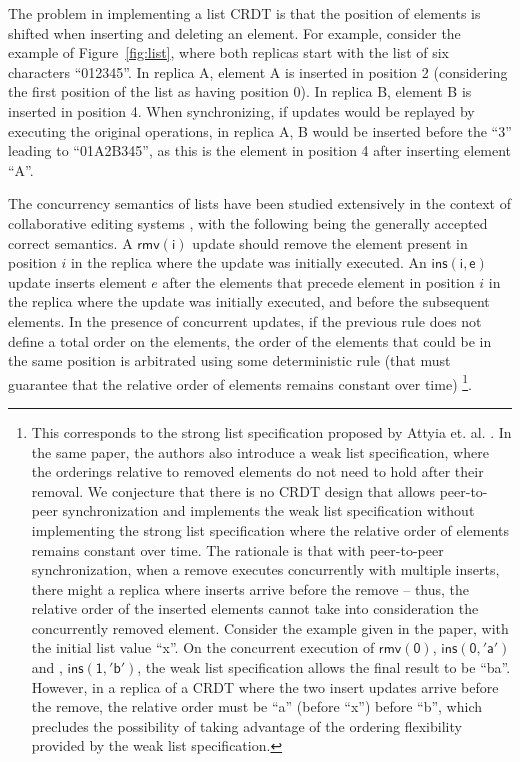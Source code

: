 \documentclass[12pt]{article}
\begin{document}
The problem in implementing a list CRDT \cite{Preguica09Commutative,Weiss09Logoot,Roh11Replicated} 
is that the position of elements
is shifted when inserting and deleting an element. For example, consider the example of 
Figure~\ref{fig:list}, where both replicas start with the list of six 
characters ``012345''.
In replica A, element A is inserted in position 2 (considering the first position of 
the list as having position 0).
In replica B, element B is inserted in position 4. 
When synchronizing, if updates would be replayed by executing the original operations, 
in replica A, B would be inserted before the ``3'' leading to ``01A2B345'', as this is 
the element in position 4 after inserting element ``A''. 

The concurrency semantics of lists have been studied extensively in the context of 
collaborative editing systems \cite{Sun98Operational}, with the following being 
the generally accepted correct semantics. 
A $\mathsf{rmv(i)}$ update should remove the element present in position $i$ in 
the replica where the update was initially executed.
An $\mathsf{ins(i,e)}$ update inserts element $e$ after the elements that precede 
element in position $i$ in the replica where the update was initially executed, 
and before the subsequent elements.
In the presence of concurrent updates, if the previous rule does not define a total
order on the elements, the order of the elements that could be in the same position
is arbitrated using some deterministic rule (that must guarantee that the relative 
order of elements remains constant over time) \footnote{This corresponds to the
strong list specification proposed by Attyia et. al. \cite{Attiya16Specification}. 
In the same paper, the authors also introduce a weak list specification, where the 
orderings relative to removed elements do not need to hold after their removal.
We conjecture that there is no CRDT design that allows peer-to-peer synchronization
and implements the weak list specification 
without implementing the strong list specification where the relative order of elements
remains constant over time. The rationale is that with peer-to-peer synchronization, 
when a remove executes concurrently with multiple inserts, there might a replica where
inserts arrive before the remove -- thus, the relative order of the inserted elements
cannot take into consideration the concurrently removed element. Consider the example
given in the paper, with the initial list value ``x''. On the concurrent execution of
$\mathsf{rmv(0)}$, $\mathsf{ins(0,'a')}$ and , $\mathsf{ins(1,'b')}$, the weak list 
specification allows the final result to be ``ba''. However, in a replica of a CRDT 
where the two insert updates arrive before the remove, the relative order must be
``a'' (before ``x'') before ``b'', which precludes the possibility of taking advantage 
of the ordering flexibility provided by the weak list specification.}.
\end{document}
